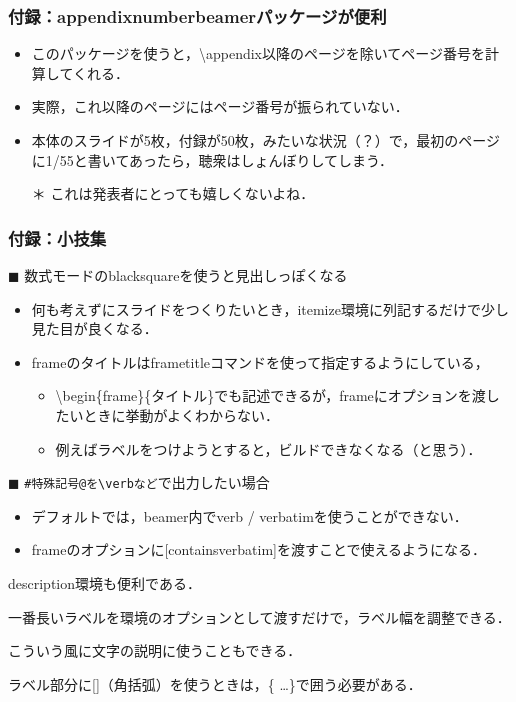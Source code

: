 \documentclass[unicode, 9pt, aspectratio=169]{beamer}
\begin{document}
\begin{frame}
\frametitle{付録：appendixnumberbeamerパッケージが便利}
\begin{itemize}
    \item このパッケージを使うと，\backslash appendix以降のページを除いてページ番号を計算してくれる．
    \item 実際，これ以降のページにはページ番号が振られていない．
    \item 本体のスライドが5枚，付録が50枚，みたいな状況（？）で，最初のページに1/55と書いてあったら，聴衆はしょんぼりしてしまう．
    \item[＊] これは発表者にとっても嬉しくないよね．
\end{itemize}
\end{frame}

\begin{frame}[containsverbatim]
\frametitle{付録：小技集}
$\blacksquare$ 数式モードのblacksquareを使うと見出しっぽくなる
\begin{itemize}
    \item 何も考えずにスライドをつくりたいとき，itemize環境に列記するだけで少し見た目が良くなる．
    \item frameのタイトルはframetitleコマンドを使って指定するようにしている，
    \begin{itemize}
        \item \backslash begin\{frame\}\{タイトル\}でも記述できるが，frameにオプションを渡したいときに挙動がよくわからない．
        \item 例えばラベルをつけようとすると，ビルドできなくなる（と思う）．
    \end{itemize}
\end{itemize}

$\blacksquare$ \verb+#特殊記号@を\verbなど+で出力したい場合
\begin{itemize}
    \item デフォルトでは，beamer内でverb / verbatimを使うことができない．
    \item frameのオプションに[containsverbatim]を渡すことで使えるようになる．
\end{itemize}

\begin{block}{}
\begin{description}[ラベルの長さ]
    \item[ラベル] description環境も便利である．
    \item[ラベルの長さ] 一番長いラベルを環境のオプションとして渡すだけで，ラベル幅を調整できる．
    \item[{$x \in [0, 1]$}] こういう風に文字の説明に使うこともできる．
    \item[注意点] ラベル部分に[]（角括弧）を使うときは，\{ \dots \}で囲う必要がある．
\end{description}
\end{block}
\end{frame}

\end{document}

